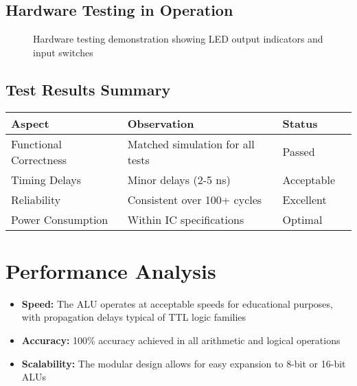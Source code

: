 \subsection{Hardware Testing in Operation}

\begin{figure}[h]
    \centering
    \caption{Hardware testing demonstration showing LED output indicators and input switches}
    \label{fig:hardware-testing}
\end{figure}

\subsection{Test Results Summary}

\begin{table}
\centering
\begin{tabular}{llll}
\toprule
\textbf{Aspect} & \textbf{Observation} & \textbf{Status} \\
\midrule
Functional Correctness & Matched simulation for all tests & Passed \\
Timing Delays & Minor delays (2-5 ns) & Acceptable \\
Reliability & Consistent over 100+ cycles & Excellent \\
Power Consumption & Within IC specifications & Optimal \\
\bottomrule
\end{tabular}
\label{tab:validation-results}
\end{table}

\section{Performance Analysis}

\begin{itemize}
    \item \textbf{Speed:} The ALU operates at acceptable speeds for educational purposes, with propagation delays typical of TTL logic families
    \item \textbf{Accuracy:} 100\% accuracy achieved in all arithmetic and logical operations
    \item \textbf{Scalability:} The modular design allows for easy expansion to 8-bit or 16-bit ALUs
\end{itemize}

